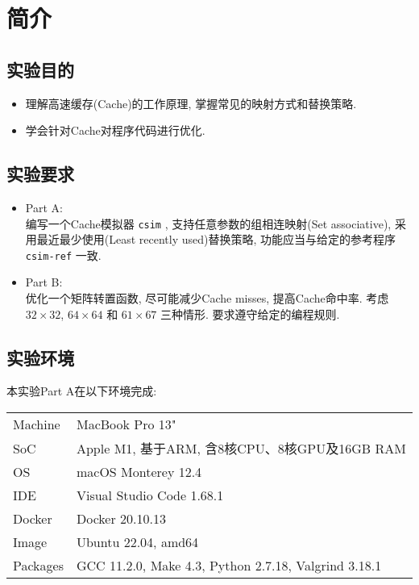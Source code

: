 
\section{简介}

\subsection{实验目的}

\begin{itemize}[noitemsep]
    \item 理解高速缓存(Cache)的工作原理, 掌握常见的映射方式和替换策略.
    \item 学会针对Cache对程序代码进行优化.
\end{itemize}

\subsection{实验要求}

\begin{itemize}
  \item Part A: \\编写一个Cache模拟器 \verb|csim| , 支持任意参数的组相连映射(Set associative), 采用最近最少使用(Least recently used)替换策略, 功能应当与给定的参考程序 \verb|csim-ref| 一致.
  \item Part B: \\优化一个矩阵转置函数, 尽可能减少Cache misses, 提高Cache命中率. 考虑 $32 \times 32$, $ 64 \times 64$ 和 $ 61 \times 67$ 三种情形. 要求遵守给定的编程规则.
\end{itemize}

\subsection{实验环境}

本实验Part A在以下环境完成:
\begin{center}
    \small
    \begin{tabular}{ll}
      \toprule
      Machine & MacBook Pro 13" \\
      SoC & Apple M1, 基于ARM, 含8核CPU、8核GPU及16GB RAM \\
      OS & macOS Monterey 12.4 \\
      IDE & Visual Studio Code 1.68.1 \\
      Docker & Docker 20.10.13 \\
      Image & Ubuntu 22.04, amd64 \\
      Packages & GCC 11.2.0, Make 4.3, Python 2.7.18, Valgrind 3.18.1\\
      \bottomrule
    \end{tabular}
\end{center}

